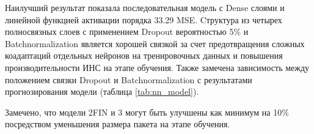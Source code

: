 \documentclass[oneside,14pt]{extarticle} %
\begin{document}
	Наилучший результат показала последовательная модель с Dense слоями и линейной функцией активации порядка 33.29 MSE. Cтруктура из четырех полносвязных слоев с применением Dropout вероятностью 5\% и Batchnormalization является хорошей связкой за счет предотвращения сложных коадаптаций отдельных нейронов на тренировочных данных и повышения производительности ИНС на этапе обучения. Также замечена зависимость между положением связки Dropout и Batchnormalization с результатами прогнозирования модели (таблица \ref{tab:nn_model}).
	
	Замечено, что модели 2FIN и 3 могут быть улучшены как минимум на 10\% посредством уменьшения размера пакета на этапе обучения.
	
\end{document}
